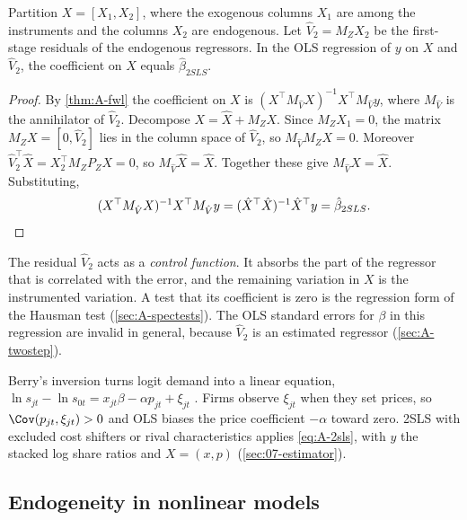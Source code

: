 \begin{proposition}\label{prop:A-cf-2sls}
Partition $X = [X_1, X_2]$, where the exogenous columns $X_1$ are among the instruments and the columns $X_2$ are
endogenous. Let $\hat V_2 = M_ZX_2$ be the first-stage residuals of the endogenous regressors. In the OLS
regression of $y$ on $X$ and $\hat V_2$, the coefficient on $X$ equals $\hat\beta_{2SLS}$.
\end{proposition}

\begin{proof}
By \cref{thm:A-fwl} the coefficient on $X$ is $(X^\top M_{\hat V}X)^{-1}X^\top M_{\hat V}y$, where $M_{\hat V}$ is the
annihilator of $\hat V_2$. Decompose $X = \hat X + M_ZX$. Since $M_ZX_1 = 0$, the matrix $M_ZX = [0, \hat V_2]$
lies in the column space of $\hat V_2$, so $M_{\hat V}M_ZX = 0$. Moreover
$\hat V_2^\top\hat X = X_2^\top M_ZP_ZX = 0$, so $M_{\hat V}\hat X = \hat X$. Together these give $M_{\hat V}X = \hat X$.
Substituting,
\begin{equation*}
(X^\top M_{\hat V}X)^{-1}X^\top M_{\hat V}y = (\hat X^\top\hat X)^{-1}\hat X^\top y = \hat\beta_{2SLS} .
\qedhere
\end{equation*}
\end{proof}

The residual $\hat V_2$ acts as a \emph{control function}. It absorbs the part of the regressor that is
correlated with the error, and the remaining variation in $X$ is the instrumented variation. A test that its
coefficient is zero is the regression form of the Hausman test (\cref{sec:A-spectests}). The OLS standard
errors for $\beta$ in this regression are invalid in general, because $\hat V_2$ is an estimated regressor
(\cref{sec:A-twostep}).

Berry's inversion turns logit demand into a linear equation,
$\ln s_{jt} - \ln s_{0t} = x_{jt}\beta - \alpha p_{jt} + \xi_{jt}$ \citep{Berry1994}. Firms observe $\xi_{jt}$ when
they set prices, so $\Cov(p_{jt}, \xi_{jt}) > 0$ and OLS biases the price coefficient $-\alpha$ toward zero. 2SLS
with excluded cost shifters or rival characteristics applies \eqref{eq:A-2sls}, with $y$ the stacked log share
ratios and $X = (x, p)$ (\cref{sec:07-estimator}).

\subsection{Endogeneity in nonlinear models}\label{sec:A-nonlinear-iv}

